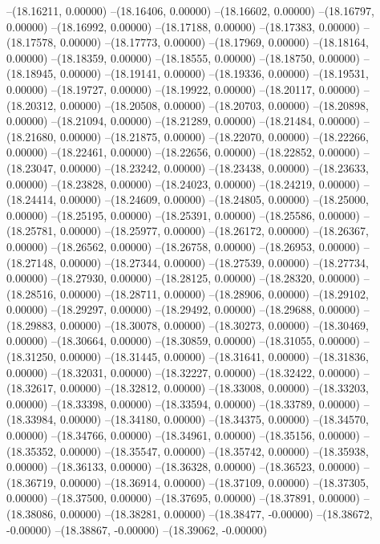 --(18.16211, 0.00000)
--(18.16406, 0.00000)
--(18.16602, 0.00000)
--(18.16797, 0.00000)
--(18.16992, 0.00000)
--(18.17188, 0.00000)
--(18.17383, 0.00000)
--(18.17578, 0.00000)
--(18.17773, 0.00000)
--(18.17969, 0.00000)
--(18.18164, 0.00000)
--(18.18359, 0.00000)
--(18.18555, 0.00000)
--(18.18750, 0.00000)
--(18.18945, 0.00000)
--(18.19141, 0.00000)
--(18.19336, 0.00000)
--(18.19531, 0.00000)
--(18.19727, 0.00000)
--(18.19922, 0.00000)
--(18.20117, 0.00000)
--(18.20312, 0.00000)
--(18.20508, 0.00000)
--(18.20703, 0.00000)
--(18.20898, 0.00000)
--(18.21094, 0.00000)
--(18.21289, 0.00000)
--(18.21484, 0.00000)
--(18.21680, 0.00000)
--(18.21875, 0.00000)
--(18.22070, 0.00000)
--(18.22266, 0.00000)
--(18.22461, 0.00000)
--(18.22656, 0.00000)
--(18.22852, 0.00000)
--(18.23047, 0.00000)
--(18.23242, 0.00000)
--(18.23438, 0.00000)
--(18.23633, 0.00000)
--(18.23828, 0.00000)
--(18.24023, 0.00000)
--(18.24219, 0.00000)
--(18.24414, 0.00000)
--(18.24609, 0.00000)
--(18.24805, 0.00000)
--(18.25000, 0.00000)
--(18.25195, 0.00000)
--(18.25391, 0.00000)
--(18.25586, 0.00000)
--(18.25781, 0.00000)
--(18.25977, 0.00000)
--(18.26172, 0.00000)
--(18.26367, 0.00000)
--(18.26562, 0.00000)
--(18.26758, 0.00000)
--(18.26953, 0.00000)
--(18.27148, 0.00000)
--(18.27344, 0.00000)
--(18.27539, 0.00000)
--(18.27734, 0.00000)
--(18.27930, 0.00000)
--(18.28125, 0.00000)
--(18.28320, 0.00000)
--(18.28516, 0.00000)
--(18.28711, 0.00000)
--(18.28906, 0.00000)
--(18.29102, 0.00000)
--(18.29297, 0.00000)
--(18.29492, 0.00000)
--(18.29688, 0.00000)
--(18.29883, 0.00000)
--(18.30078, 0.00000)
--(18.30273, 0.00000)
--(18.30469, 0.00000)
--(18.30664, 0.00000)
--(18.30859, 0.00000)
--(18.31055, 0.00000)
--(18.31250, 0.00000)
--(18.31445, 0.00000)
--(18.31641, 0.00000)
--(18.31836, 0.00000)
--(18.32031, 0.00000)
--(18.32227, 0.00000)
--(18.32422, 0.00000)
--(18.32617, 0.00000)
--(18.32812, 0.00000)
--(18.33008, 0.00000)
--(18.33203, 0.00000)
--(18.33398, 0.00000)
--(18.33594, 0.00000)
--(18.33789, 0.00000)
--(18.33984, 0.00000)
--(18.34180, 0.00000)
--(18.34375, 0.00000)
--(18.34570, 0.00000)
--(18.34766, 0.00000)
--(18.34961, 0.00000)
--(18.35156, 0.00000)
--(18.35352, 0.00000)
--(18.35547, 0.00000)
--(18.35742, 0.00000)
--(18.35938, 0.00000)
--(18.36133, 0.00000)
--(18.36328, 0.00000)
--(18.36523, 0.00000)
--(18.36719, 0.00000)
--(18.36914, 0.00000)
--(18.37109, 0.00000)
--(18.37305, 0.00000)
--(18.37500, 0.00000)
--(18.37695, 0.00000)
--(18.37891, 0.00000)
--(18.38086, 0.00000)
--(18.38281, 0.00000)
--(18.38477, -0.00000)
--(18.38672, -0.00000)
--(18.38867, -0.00000)
--(18.39062, -0.00000)
